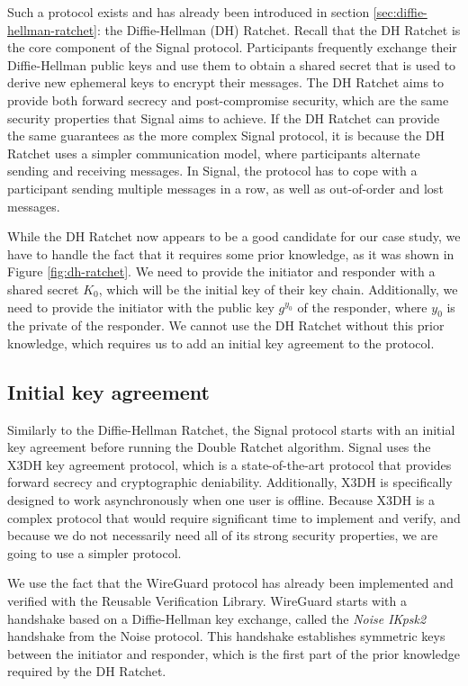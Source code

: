 Such a protocol exists and has already been introduced in section \ref{sec:diffie-hellman-ratchet}: the Diffie-Hellman (DH) Ratchet.
Recall that the DH Ratchet is the core component of the Signal protocol. Participants frequently exchange their Diffie-Hellman public keys and use them to obtain a shared secret that is used to derive new ephemeral keys to encrypt their messages.
The DH Ratchet aims to provide both forward secrecy and post-compromise security, which are the same security properties that Signal aims to achieve.
If the DH Ratchet can provide the same guarantees as the more complex Signal protocol, it is because the DH Ratchet uses a simpler communication model, where participants alternate sending and receiving messages.
In Signal, the protocol has to cope with a participant sending multiple messages in a row, as well as out-of-order and lost messages.

While the DH Ratchet now appears to be a good candidate for our case study, we have to handle the fact that it requires some prior knowledge, as it was shown in Figure \ref{fig:dh-ratchet}.
We need to provide the initiator and responder with a shared secret $K_0$, which will be the initial key of their key chain.
Additionally, we need to provide the initiator with the public key $g^{y_0}$ of the responder, where $y_0$ is the private of the responder.
We cannot use the DH Ratchet without this prior knowledge, which requires us to add an initial key agreement to the protocol.

\subsection{Initial key agreement}
\label{sec:initial-key-agreement}

Similarly to the Diffie-Hellman Ratchet, the Signal protocol starts with an initial key agreement before running the Double Ratchet algorithm.
Signal uses the X3DH key agreement protocol, which is a state-of-the-art protocol that provides forward secrecy and cryptographic deniability.
Additionally, X3DH is specifically designed to work asynchronously when one user is offline.
Because X3DH is a complex protocol that would require significant time to implement and verify, and because we do not necessarily need all of its strong security properties, we are going to use a simpler protocol.

We use the fact that the WireGuard protocol has already been implemented and verified with the Reusable Verification Library.
WireGuard starts with a handshake based on a Diffie-Hellman key exchange, called the \emph{Noise IKpsk2} handshake from the Noise protocol. This handshake establishes symmetric keys between the initiator and responder, which is the first part of the prior knowledge required by the DH Ratchet.

